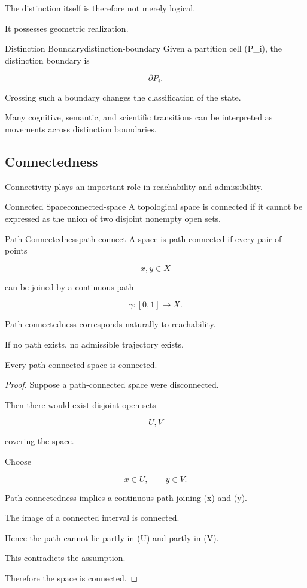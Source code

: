 \documentclass[12pt,twoside,openright]{book}
\newenvironment{prop}
{\begin{proposition}{}{}}
{\end{proposition}}
\begin{document}
The distinction itself is therefore not merely logical.

It possesses geometric realization.

\begin{definition}{Distinction Boundary}{distinction-boundary}
Given a partition cell (P_i), the distinction boundary
is

\[
\partial P_i.
\]
\end{definition}

Crossing such a boundary changes the classification of the
state.

Many cognitive, semantic, and scientific transitions can
be interpreted as movements across distinction
boundaries.

\subsection{Connectedness}

Connectivity plays an important role in reachability and
admissibility.

\begin{definition}{Connected Space}{connected-space}
A topological space is connected if it cannot be expressed
as the union of two disjoint nonempty open sets.
\end{definition}

\begin{definition}{Path Connectedness}{path-connect}
A space is path connected if every pair of points

\[
x,y\in X
\]

can be joined by a continuous path

\[
\gamma:[0,1]\rightarrow X.
\]
\end{definition}

Path connectedness corresponds naturally to reachability.

If no path exists, no admissible trajectory exists.

\begin{prop}
Every path-connected space is connected.
\end{prop}

\begin{proof}
Suppose a path-connected space were disconnected.

Then there would exist disjoint open sets

\[
U,V
\]

covering the space.

Choose

\[
x\in U,
\qquad
y\in V.
\]

Path connectedness implies a continuous path joining
(x) and (y).

The image of a connected interval is connected.

Hence the path cannot lie partly in (U) and partly in
(V).

This contradicts the assumption.

Therefore the space is connected.
\end{proof}
\end{document}
